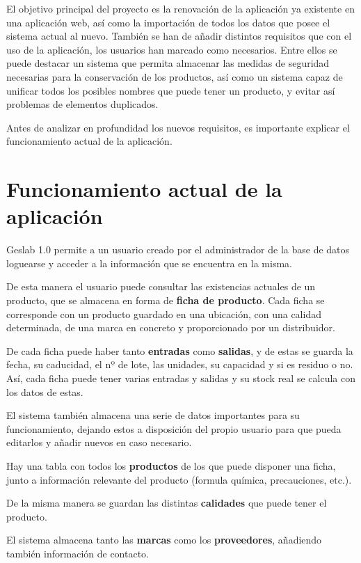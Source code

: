 
El objetivo principal del proyecto es la renovación de la aplicación ya existente en una aplicación web, así como la importación de todos los datos que posee el sistema actual al nuevo. También se han de añadir distintos requisitos que con el uso de la aplicación, los usuarios han marcado como necesarios. Entre ellos se puede destacar un sistema que permita almacenar las medidas de seguridad necesarias para la conservación de los productos, así como un sistema capaz de unificar todos los posibles nombres que puede tener un producto, y evitar así problemas de elementos duplicados.

Antes de analizar en profundidad los nuevos requisitos, es importante explicar el funcionamiento actual de la aplicación.


\section{Funcionamiento actual de la aplicación}

Geslab 1.0 permite a un usuario creado por el administrador de la base de datos loguearse y acceder a la información que se encuentra en la misma.

De esta manera el usuario puede consultar las existencias actuales de un producto, que se almacena en forma de \textbf{ficha de producto}. Cada ficha se corresponde con un producto guardado en una ubicación, con una calidad determinada, de una marca en concreto y proporcionado por un distribuidor.

De cada ficha puede haber tanto \textbf{entradas} como \textbf{salidas}, y de estas se guarda la fecha, su caducidad, el nº de lote, las unidades, su capacidad y si es residuo o no. Así, cada ficha puede tener varias entradas y salidas y su stock real se calcula con los datos de estas.

El sistema también almacena una serie de datos importantes para su funcionamiento, dejando estos a disposición del propio usuario para que pueda editarlos y añadir nuevos en caso necesario.   

Hay una tabla con todos los \textbf{productos} de los que puede disponer una ficha, junto a información relevante del producto (formula química, precauciones, etc.).

De la misma manera se guardan las distintas \textbf{calidades} que puede tener el producto.

El sistema almacena tanto las \textbf{marcas} como los \textbf{proveedores}, añadiendo también información de contacto.


